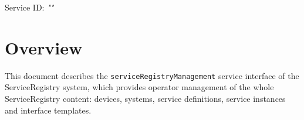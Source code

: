 \documentclass[a4paper]{arrowhead}
\begin{document}
\sloppy

\ArrowheadSetup

\begin{center}
  \vspace*{1cm}
  \huge{\arrowtitle}

  \vspace*{0.2cm}
  \LARGE{\arrowtype}
  \vspace*{1cm}

  \Large{Service ID: \textit{"\arrowid"}}

  \vspace*{\fill}


  \vspace*{1cm}
  \vspace*{\fill}

  \begin{abstract}
    This document describes the HTTP/1.1 protocol with TLS payload security and JSON payload encoding variant of the \texttt{service\allowbreak{}Registry\allowbreak{}Management} service of the ServiceRegistry system.
  \end{abstract}

  \vspace*{1cm}
\end{center}

\newpage

\tableofcontents
\newpage

\section{Overview}
\label{sec:overview}

This document describes the \texttt{service\allowbreak{}Registry\allowbreak{}Management} service interface of the ServiceRegistry system, which provides operator management of the whole ServiceRegistry content: devices, systems, service definitions, service instances and interface templates.
\end{document}
